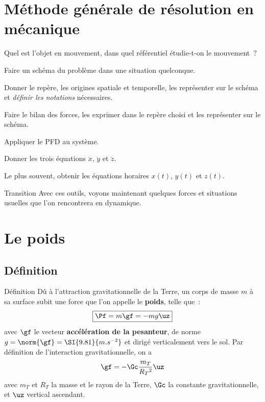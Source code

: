 \documentclass[../main/main.tex]{subfiles}
\begin{document}
\section{Méthode générale de résolution en mécanique}
\begin{enumerate}[label=\sqenumi]
     Quel est l'objet en mouvement, dans quel
    référentiel étudie-t-on le mouvement~?

     Faire un schéma du problème dans une situation quelconque.

     Donner le repère, les origines spatiale et temporelle,
    les représenter sur le schéma et \textit{définir les notations} nécessaires.

     Faire le bilan des forces, les exprimer dans le
    repère choisi et les représenter sur le schéma.

     Appliquer le PFD au système.

     Donner les trois équations $\ddot{x}$,
    $\ddot{y}$ et $\ddot{z}$.

     Le plus souvent, obtenir les équations
    horaires $x(t)$, $y(t)$ et $z(t)$.
\end{enumerate}

\begin{instruc}[trans]{Transition}
    Avec ces outils, voyons maintenant quelques forces et situations usuelles
    que l'on rencontrera en dynamique.
\end{instruc}

\section{Le poids}
\subsection{Définition}

\begin{tdefi}{Définition}
    Dû à l'attraction gravitationnelle de la Terre, un corps de masse $m$ à sa
    surface subit une force que l'on appelle le \textbf{poids}, telle que~:
    \[\boxed{\Pf = m\gf = -mg\uz}\]
    avec $\gf$ le vecteur \textbf{accélération de la pesanteur}, de norme $g =
    \norm{\gf} = \SI{9.81}{m.s^{-2}}$ et dirigé verticalement vers le sol. Par
    définition de l'interaction gravitationnelle, on a
    \[\gf = -\Gc \frac{m_T}{R_T{}^2}\uz\]
    avec $m_T$ et $R_T$ la masse et le rayon de la Terre, $\Gc$ la constante
    gravitationnelle, et $\uz$ vertical ascendant.
\end{tdefi}
\end{document}
